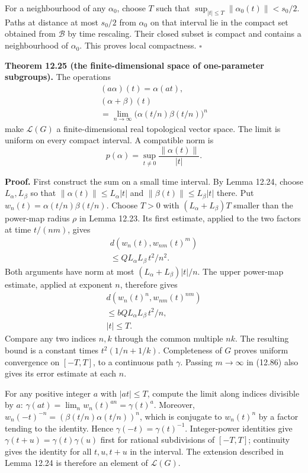 \documentclass[
  11pt,
]{article}
\begin{document}
For a neighbourhood of any \(\alpha_0\), choose \(T\) such that
\(\sup_{|t|\leq T}\|\alpha_0(t)\|<s_0/2\). Paths at distance at most
\(s_0/2\) from \(\alpha_0\) on that interval lie in the compact set
obtained from \(\mathcal B\) by time rescaling. Their closed subset is
compact and contains a neighbourhood of \(\alpha_0\). This proves local
compactness. \(\square\)

\textbf{Theorem 12.25 (the finite-dimensional space of one-parameter
subgroups).} The operations \[
\begin{gathered}
(a\alpha)(t)=\alpha(at),\\
(\alpha+\beta)(t)\\
=\lim_{n\to\infty}
       \bigl(\alpha(t/n)\beta(t/n)\bigr)^n
\end{gathered}
\tag{12.83}
\] make \(\mathcal L(G)\) a finite-dimensional real topological vector
space. The limit is uniform on every compact interval. A compatible norm
is \[
p(\alpha)=\sup_{t\ne0}
               \frac{\|\alpha(t)\|}{|t|}.
\tag{12.84}
\]

\textbf{Proof.} First construct the sum on a small time interval. By
Lemma 12.24, choose \(L_\alpha,L_\beta\) so that
\(\|\alpha(t)\|\leq L_\alpha|t|\) and \(\|\beta(t)\|\leq L_\beta|t|\)
there. Put \(w_n(t)=\alpha(t/n)\beta(t/n)\). Choose \(T>0\) with
\((L_\alpha+L_\beta)T\) smaller than the power-map radius \(\rho\) in
Lemma 12.23. Its first estimate, applied to the two factors at time
\(t/(nm)\), gives \[
\begin{gathered}
d(w_n(t),w_{nm}(t)^m)\\
\leq QL_\alpha L_\beta\,t^2/n^2.
\end{gathered}
\tag{12.85}
\] Both arguments have norm at most \((L_\alpha+L_\beta)|t|/n\). The
upper power-map estimate, applied at exponent \(n\), therefore gives \[
\begin{gathered}
d(w_n(t)^n,w_{nm}(t)^{nm})\\
\leq bQL_\alpha L_\beta\,t^2/n,\\
|t|\leq T.
\end{gathered}
\tag{12.86}
\] Compare any two indices \(n,k\) through the common multiple \(nk\).
The resulting bound is a constant times \(t^2(1/n+1/k)\). Completeness
of \(G\) proves uniform convergence on \([-T,T]\), to a continuous path
\(\gamma\). Passing \(m\to\infty\) in (12.86) also gives its error
estimate at each \(n\).

For any positive integer \(a\) with \(|at|\leq T\), compute the limit
along indices divisible by \(a\):
\(\gamma(at)=\lim_n w_n(t)^{an}=\gamma(t)^a\). Moreover,
\(w_n(-t)^{-n}=(\beta(t/n)\alpha(t/n))^n\), which is conjugate to
\(w_n(t)^n\) by a factor tending to the identity. Hence
\(\gamma(-t)=\gamma(t)^{-1}\). Integer-power identities give
\(\gamma(t+u)=\gamma(t)\gamma(u)\) first for rational subdivisions of
\([-T,T]\); continuity gives the identity for all \(t,u,t+u\) in the
interval. The extension described in Lemma 12.24 is therefore an element
of \(\mathcal L(G)\).
\end{document}
